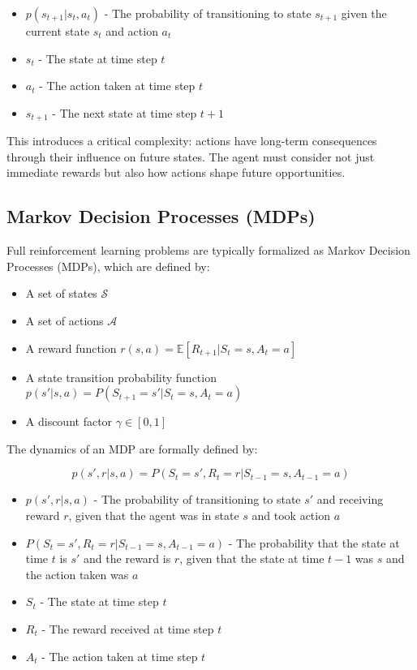 \documentclass[12pt,a4paper]{article}
\begin{document}
\begin{tcolorbox}[title=Notation Overview]
\begin{itemize}
    \item $p(s_{t+1}|s_t, a_t)$ - The probability of transitioning to state $s_{t+1}$ given the current state $s_t$ and action $a_t$
    \item $s_t$ - The state at time step $t$
    \item $a_t$ - The action taken at time step $t$
    \item $s_{t+1}$ - The next state at time step $t+1$
\end{itemize}
\end{tcolorbox}

This introduces a critical complexity: actions have long-term consequences through their influence on future states. The agent must consider not just immediate rewards but also how actions shape future opportunities.

\subsection{Markov Decision Processes (MDPs)}

Full reinforcement learning problems are typically formalized as Markov Decision Processes (MDPs), which are defined by:

\begin{itemize}
    \item A set of states $\mathcal{S}$
    \item A set of actions $\mathcal{A}$
    \item A reward function $r(s, a) = \mathbb{E}[R_{t+1}|S_t = s, A_t = a]$
    \item A state transition probability function $p(s'|s, a) = P(S_{t+1} = s'|S_t = s, A_t = a)$
    \item A discount factor $\gamma \in [0, 1]$
\end{itemize}

The dynamics of an MDP are formally defined by:

\begin{equation}
p(s',r|s,a) = P(S_t = s', R_t = r|S_{t-1} = s, A_{t-1} = a)
\end{equation}

\begin{tcolorbox}[title=Notation Overview]
\begin{itemize}
    \item $p(s',r|s,a)$ - The probability of transitioning to state $s'$ and receiving reward $r$, given that the agent was in state $s$ and took action $a$
    \item $P(S_t = s', R_t = r|S_{t-1} = s, A_{t-1} = a)$ - The probability that the state at time $t$ is $s'$ and the reward is $r$, given that the state at time $t-1$ was $s$ and the action taken was $a$
    \item $S_t$ - The state at time step $t$
    \item $R_t$ - The reward received at time step $t$
    \item $A_t$ - The action taken at time step $t$
\end{itemize}
\end{tcolorbox}
\end{document}

